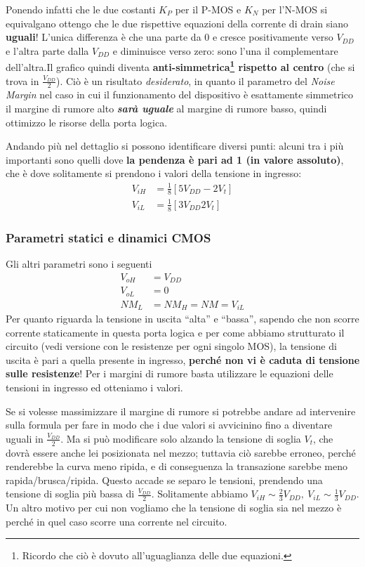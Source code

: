 \documentclass[
]{book}
\begin{document}
Ponendo infatti che le due costanti \(K_{P}\) per il P-MOS e \(K_{N}\)
per l'N-MOS si equivalgano ottengo che le due rispettive equazioni della
corrente di drain siano \textbf{uguali}! L'unica differenza è che una
parte da \(0\) e cresce positivamente verso \(V_{DD}\) e l'altra parte
dalla \(V_{DD}\) e diminuisce verso zero: sono l'una il complementare
dell'altra.\newline Il grafico quindi diventa
\textbf{anti-simmetrica\footnote{Ricordo che ciò è dovuto
  all'uguaglianza delle due equazioni.} rispetto al centro} (che si
trova in \(\frac{V_{DD}}{2}\)). Ciò è un risultato \emph{desiderato}, in
quanto il parametro del \emph{Noise Margin} nel caso in cui il
funzionamento del dispositivo è esattamente simmetrico il margine di
rumore alto \textbf{\emph{sarà uguale}} al margine di rumore basso,
quindi ottimizzo le risorse della porta logica.

Andando più nel dettaglio si possono identificare diversi punti: alcuni
tra i più importanti sono quelli dove \textbf{la pendenza è pari ad 1
(in valore assoluto)}, che è dove solitamente si prendono i valori della
tensione in ingresso: \begin{align*}
V_{iH}&=\frac{1}{8}[5V_{DD}-2V_{t}]\\
V_{iL}&=\frac{1}{8}[3V_{DD}2V_{t}]
\end{align*}

\subsubsection{Parametri statici e dinamici
CMOS}\label{parametri-statici-e-dinamici-cmos}

Gli altri parametri sono i seguenti \begin{align*}
V_{oH}&=V_{DD}\\V_{oL}&=0\\NM_{L}&=NM_{H}=NM=V_{iL}
\end{align*} Per quanto riguarda la tensione in uscita ``alta'' e
``bassa'', sapendo che non scorre corrente staticamente in questa porta
logica e per come abbiamo strutturato il circuito (vedi versione con le
resistenze per ogni singolo MOS), la tensione di uscita è pari a quella
presente in ingresso, \textbf{perché non vi è caduta di tensione sulle
resistenze}! Per i margini di rumore basta utilizzare le equazioni delle
tensioni in ingresso ed otteniamo i valori.

Se si volesse massimizzare il margine di rumore si potrebbe andare ad
intervenire sulla formula per fare in modo che i due valori si
avvicinino fino a diventare uguali in \(\frac{V_{DD}}{2}\). Ma si può
modificare solo alzando la tensione di soglia \(V_{t}\), che dovrà
essere anche lei posizionata nel mezzo; tuttavia ciò sarebbe erroneo,
perché renderebbe la curva meno ripida, e di conseguenza la transazione
sarebbe meno rapida/brusca/ripida. Questo accade se separo le tensioni,
prendendo una tensione di soglia più bassa di \(\frac{V_{DD}}{2}\).
Solitamente abbiamo
\(V_{iH}\sim\frac{2}{3}V_{DD},\:V_{iL}\sim\frac{1}{3}V_{DD}\). Un altro
motivo per cui non vogliamo che la tensione di soglia sia nel mezzo è
perché in quel caso scorre una corrente nel circuito.
\end{document}
